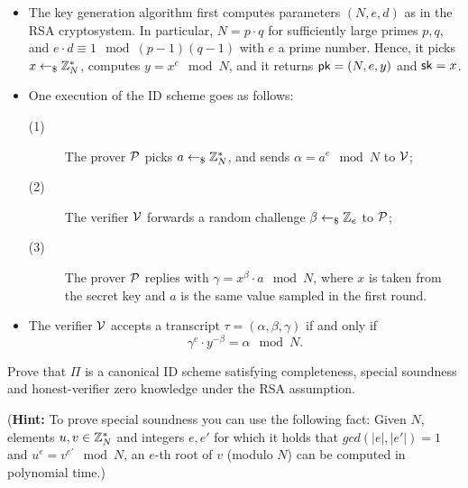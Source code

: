 \begin{itemize}
    \item The key generation algorithm first computes parameters $(N, e, d)$ as in the RSA cryptosystem. In particular, $N = p \cdot q$ for sufficiently large primes $p, q$, and $e \cdot d \equiv 1 \mod (p - 1)(q - 1)$ with $e$ a prime number. Hence, it picks $x \leftarrow_\$ \mathbb Z_N^*$, computes $y = x^e \mod N$, and it returns $\mathsf{pk} = (N, e, y)$ and $\mathsf{sk} = x$.
    \item One execution of the ID scheme goes as follows:
          \begin{description}
              \item[(1)] The prover $\mathcal{P}$ picks $a \leftarrow_\$ \mathbb Z_N^*$, and  sends $\alpha = a^e \mod N$ to $\mathcal{V}$;
              \item[(2)] The verifier $\mathcal{V}$ forwards a random challenge $\beta \leftarrow_\$ \mathbb Z_e$ to $\mathcal{P}$;
              \item[(3)] The prover $\mathcal{P}$ replies with $\gamma = x^\beta \cdot a \mod N$, where $x$ is taken from the secret key and $a$ is the same value sampled in the first round.
          \end{description}
    \item The verifier $\mathcal{V}$ accepts a transcript $\tau = (\alpha, \beta, \gamma)$ if and only if \[\gamma^e \cdot y^{-\beta} = \alpha \mod N.\]
\end{itemize}

Prove that $\Pi$ is a canonical ID scheme satisfying completeness, special soundness and honest-verifier zero knowledge under the RSA assumption.

(\textbf{Hint:} To prove special soundness you can use the following fact: Given $N$, elements $u, v \in \mathbb Z_N^*$ and integers $e, e'$ for which it holds that $gcd(|e|, |e'|) = 1$ and $u^e = v^{e'} \mod N$, an $e$-th root of $v$
(modulo $N$) can be computed in polynomial time.)


